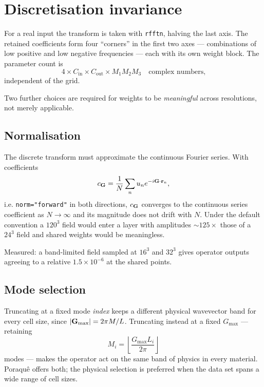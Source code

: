 \section{Discretisation invariance}
\label{sec:discinv}

For a real input the transform is taken with \texttt{rfftn}, halving the last
axis. The retained coefficients form four ``corners'' in the first two axes
--- combinations of low positive and low negative frequencies --- each with its
own weight block. The parameter count is
\begin{equation}
  4 \times C_{\mathrm{in}} \times C_{\mathrm{out}} \times M_1 M_2 M_3
  \quad\text{complex numbers,}
\end{equation}
independent of the grid.

Two further choices are required for weights to be \emph{meaningful} across
resolutions, not merely applicable.

\subsection{Normalisation}

The discrete transform must approximate the continuous Fourier series. With
coefficients
\begin{equation}
  c_{\mathbf{G}} = \frac{1}{N}\sum_{n} u_n e^{-i\mathbf{G}\cdot\mathbf{r}_n},
\end{equation}
i.e. \texttt{norm="forward"} in both directions, $c_{\mathbf{G}}$ converges to the
continuous series coefficient as $N\to\infty$ and its magnitude does not drift
with $N$. Under the default convention a $120^3$ field would enter a layer with
amplitudes $\sim125\times$ those of a $24^3$ field and shared weights would be
meaningless.

\begin{ptip}
Measured: a band-limited field sampled at $16^3$ and $32^3$ gives operator
outputs agreeing to a relative $1.5\times10^{-6}$ at the shared points.
\end{ptip}

\subsection{Mode selection}

Truncating at a fixed mode \emph{index} keeps a different physical wavevector
band for every cell size, since $|\mathbf{G}_{\max}| = 2\pi M/L$. Truncating instead
at a fixed $G_{\max}$ --- retaining
\begin{equation}
  M_i = \left\lfloor \frac{G_{\max} L_i}{2\pi} \right\rfloor
\end{equation}
modes --- makes the operator act on the same band of physics in every material.
Poraqu\^e offers both; the physical selection is preferred when the data set
spans a wide range of cell sizes.

